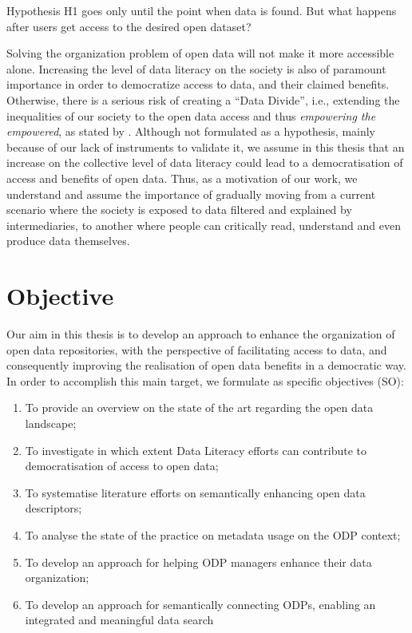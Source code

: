 {Hypothesis H1 goes only until the point when data is found.
But what happens after users get access to the desired open dataset?

Solving the organization problem of open data will not make it more accessible alone.
Increasing the level of data literacy on the society is also of paramount importance in order to democratize access to data, and their claimed benefits.
Otherwise, there is a serious risk of creating a ``Data Divide'', i.e., extending the inequalities of our society to the open data access and thus \emph{empowering the empowered}, as stated by .
Although not formulated as a hypothesis, mainly because of our lack of instruments to validate it, we assume in this thesis that an increase on the collective level of data literacy could lead to a democratisation of access and benefits of open data.
Thus, as a motivation of our work, we understand and assume the importance of gradually moving from a current scenario where the society is exposed to data filtered and explained by intermediaries, to another where people can critically read, understand and even produce data themselves.

\section{Objective}

Our aim in this thesis is to develop an approach to enhance the organization of open data repositories, with the perspective of facilitating access to data, and consequently improving the realisation of open data benefits in a democratic way.
In order to accomplish this main target, we formulate as specific objectives (SO):
\begin{enumerate}
	\item To provide an overview on the state of the art regarding the open data landscape;
	\item To investigate in which extent Data Literacy efforts can contribute to democratisation of access to open data;
	\item To systematise literature efforts on semantically enhancing open data descriptors;
	\item To analyse the state of the practice on metadata usage on the ODP context;
	\item To develop an approach for helping ODP managers enhance their data organization;
	\item To develop an approach for semantically connecting ODPs, enabling an integrated and meaningful data search
\end{enumerate}

}
